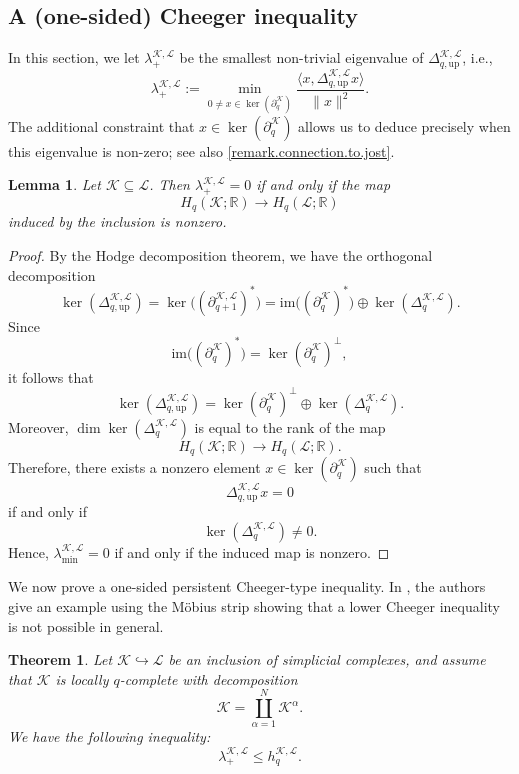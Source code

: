 \documentclass{article}
\newtheorem{theorem}{Theorem}[section]
\newtheorem{lemma}{Lemma}[section]
\newcommand{\R}{\mathbb{R}}
\newcommand{\KK}{\mathcal{K}}
\newcommand{\LL}{\mathcal{L}}
\newcommand{\im}{\mathrm{im}}
\begin{document}
\subsection{A (one-sided) Cheeger inequality}\label{sec:cmplt_cheeger_ineq}
In this section, we let $\lambda_{+}^{\KK, \LL}$ be the smallest non-trivial eigenvalue of $\Delta_{q, \text{up}}^{\KK, \LL}$,
i.e.,
\[
\lambda_{+}^{\KK, \LL}
:=
\min_{0 \neq x\in \ker(\partial_q^\KK)}\frac{\langle x, \Delta_{q, \text{up}}^{\KK, \LL}x\rangle}{\|x\|^2}.
\]
The additional constraint that $x\in \ker(\partial_q^\KK)$ allows us to deduce precisely when this eigenvalue is non-zero; see also \cref{remark.connection.to.jost}.

\begin{lemma}
Let $\KK \subseteq \LL$. Then $\lambda_{+}^{\KK,\LL}=0$ if and only if the map
\[
H_q(\KK;\R) \longrightarrow H_q(\LL;\R)
\]
induced by the inclusion is nonzero.
\end{lemma}

\begin{proof}
By the Hodge decomposition theorem, we have the orthogonal decomposition
\[
\ker(\Delta_{q,\mathrm{up}}^{\KK,\LL})
=
\ker\bigl((\partial_{q+1}^{\KK,\LL})^*\bigr)
=
\im\bigl((\partial_q^\KK)^*\bigr)
\oplus
\ker(\Delta_q^{\KK,\LL}).
\]
Since
\[
\im\bigl((\partial_q^\KK)^*\bigr)
=
\ker(\partial_q^\KK)^\perp,
\]
it follows that
\[
\ker(\Delta_{q,\mathrm{up}}^{\KK,\LL})
=
\ker(\partial_q^\KK)^\perp
\oplus
\ker(\Delta_q^{\KK,\LL}).
\]
Moreover, $\dim \ker(\Delta_q^{\KK,\LL})$ is equal to the rank of the map
\[
H_q(\KK;\R) \longrightarrow H_q(\LL;\R).
\]
Therefore, there exists a nonzero element
$x \in \ker(\partial_q^\KK)$ such that
\[
\Delta_{q,\mathrm{up}}^{\KK,\LL} x = 0
\]
if and only if
\[
\ker(\Delta_q^{\KK,\LL}) \neq 0.
\]
Hence, $\lambda_{\min}^{\KK,\LL}=0$ if and only if the induced map is nonzero.
\end{proof}

We now prove a one-sided persistent Cheeger-type inequality. In \cite[Section 4.2]{MR3516884}, the authors give an example using the M\"obius strip showing that a lower Cheeger inequality is not possible in general.

\begin{theorem}\label{prop:nt_cheeger_ineq_cmplx}
Let $\KK\hookrightarrow \LL$ be an inclusion of simplicial complexes, and assume that $\KK$ is locally $q$-complete with decomposition
\[
\KK = \coprod_{\alpha=1}^N \KK^\alpha.
\]
We have the following inequality:
\begin{equation}\label{eq:cheeger_ineq_cmplt_skl}
\lambda_{+}^{\KK, \LL}\leq h_{q}^{\KK, \LL}.
\end{equation}
\end{theorem}
\end{document}
